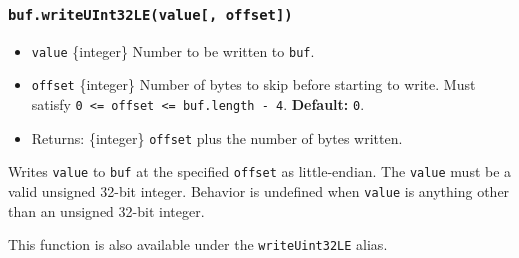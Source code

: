\subsubsection{\texorpdfstring{\texttt{buf.writeUInt32LE(value{[},\ offset{]})}}{buf.writeUInt32LE(value{[}, offset{]})}}\label{buf.writeuint32levalue-offset}

\begin{itemize}
\tightlist
\item
  \texttt{value} \{integer\} Number to be written to \texttt{buf}.
\item
  \texttt{offset} \{integer\} Number of bytes to skip before starting to
  write. Must satisfy
  \texttt{0\ \textless{}=\ offset\ \textless{}=\ buf.length\ -\ 4}.
  \textbf{Default:} \texttt{0}.
\item
  Returns: \{integer\} \texttt{offset} plus the number of bytes written.
\end{itemize}

Writes \texttt{value} to \texttt{buf} at the specified \texttt{offset}
as little-endian. The \texttt{value} must be a valid unsigned 32-bit
integer. Behavior is undefined when \texttt{value} is anything other
than an unsigned 32-bit integer.

This function is also available under the \texttt{writeUint32LE} alias.

\begin{Shaded}
\begin{Highlighting}[]
\NormalTok{ \{ }\NormalTok{ \} } \OperatorTok{;}

\OperatorTok{=} \NormalTok{(}\NormalTok{)}\OperatorTok{;}

\NormalTok{(}\OperatorTok{,} \NormalTok{)}\OperatorTok{;}

\OperatorTok{;}
\end{Highlighting}
\end{Shaded}

